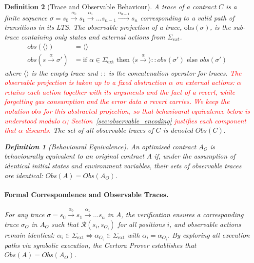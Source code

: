 \documentclass[manuscript,screen,review]{acmart}
\newcommand{\revised}[1]{\textcolor{red}{#1}}
\newtheorem{definition}{Definition}
\begin{document}
\begin{definition}[Trace and Observable Behaviour]
\label{def:trace}
A \emph{trace} of a contract \(C\) is a finite sequence $\sigma = s_0\!\xrightarrow{\alpha_0}s_1\!\xrightarrow{\alpha_1} \ldots s_{n{-}1}\!\xrightarrow{\alpha_{n{-}1}}s_n$ corresponding to a valid path of transitions in its LTS. The \emph{observable projection} of a trace, \(\text{obs}(\sigma)\), is the sub-trace containing only states and external actions from \(\Sigma_{ext}\).
\[
\begin{aligned}
\mathit{obs}(\langle\rangle) &= \langle\rangle \\
\mathit{obs}(s\xrightarrow{\alpha} \sigma') &= \text{if } \alpha \in \Sigma_{\mathrm{ext}} \text{ then } \langle s\xrightarrow{\alpha}\rangle \mathbin{::} \mathit{obs}(\sigma') \text{ else } \mathit{obs}(\sigma')
\end{aligned}
\]
where $\langle\rangle$ is the empty trace and $::$ is the concatenation operator for traces. \revised{The observable projection is taken up to a fixed abstraction $\alpha$ on external actions: $\alpha$ retains each action together with its arguments and the \emph{fact} of a revert, while forgetting gas consumption and the error data a revert carries. We keep the notation $\mathit{obs}$ for this abstracted projection, so that behavioural equivalence below is understood modulo $\alpha$; Section~\ref{sec:observable_encoding} justifies each component that $\alpha$ discards.}
The set of all observable traces of \(C\) is denoted \(\mathit{Obs}(C)\).

\begin{definition}[Behavioural Equivalence]
An optimised contract $A_O$ is \emph{behaviourally equivalent} to an original contract $A$ if, under the assumption of identical initial states and environment variables, their sets of observable traces are identical: \(\mathit{Obs}(A) = \mathit{Obs}(A_O)\).
\end{definition}

\paragraph{Formal Correspondence and Observable Traces.}
For any trace $\sigma = s_0 \xrightarrow{\alpha_0} s_1 \xrightarrow{\alpha_1} \ldots s_n$ in $A$, the verification ensures a corresponding trace $\sigma_O$ in $A_O$ such that $\mathcal{R}(s_i, s_{O_i})$ for all positions $i$, and observable actions remain identical: $\alpha_i \in \Sigma_{\text{ext}} \iff \alpha_{O_i} \in \Sigma_{\text{ext}}$ with $\alpha_i = \alpha_{O_i}$. By exploring all execution paths via symbolic execution, the Certora Prover establishes that $\mathit{Obs}(A) = \mathit{Obs}(A_O)$.


\end{definition}
\end{document}
